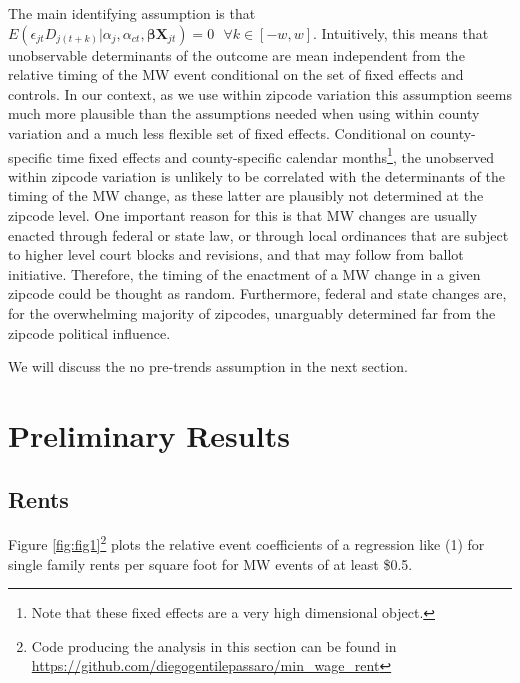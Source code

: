 \documentclass{article}
\begin{document}
The main identifying assumption is that $E \left( \epsilon_{jt} D_{j(t+k)} | \alpha_j, \alpha_{ct}, \boldsymbol{\beta} \boldsymbol{X}_{jt}\right)  = 0  \ \ \ \forall k\in[-w, w]$. Intuitively, this means that unobservable determinants of the outcome are mean independent from the relative timing of the MW event conditional on the set of fixed effects and controls. In our context, as we use within zipcode variation this assumption seems much more plausible than the assumptions needed when using within county variation and a much less flexible set of fixed effects. Conditional on county-specific time fixed effects and county-specific calendar months\footnote{Note that these fixed effects are a very high dimensional object.}, the unobserved within zipcode variation is unlikely to be correlated with the determinants of the timing of the MW change, as these latter are plausibly not determined at the zipcode level. One important reason for this is that MW changes are usually enacted through federal or state law, or through local ordinances that are subject to higher level court blocks and revisions, and that may follow from ballot initiative. Therefore, the timing of the enactment of a MW change in a given zipcode could be thought as random. Furthermore, federal and state changes are, for the overwhelming majority of zipcodes, unarguably determined far from the zipcode political influence. 

We will discuss the no pre-trends assumption in the next section.

\section{Preliminary Results}

\subsection{Rents}

Figure \ref{fig:fig1}\footnote{Code producing the analysis in this section can be found in \url{https://github.com/diegogentilepassaro/min_wage_rent}} plots the relative event coefficients of a regression like (1) for single family rents per square foot for MW events of at least \$0.5. 
\end{document}

